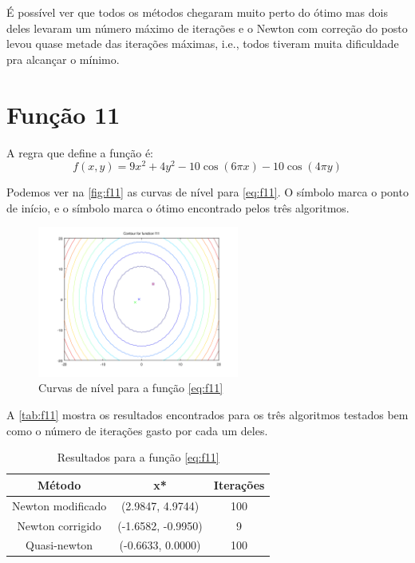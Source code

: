 \documentclass[12pt]{article}
\begin{document}
É possível ver que todos os métodos chegaram muito perto do ótimo mas dois deles levaram um número máximo de iterações e 
o Newton com correção do posto levou quase metade das iterações máximas, i.e., todos tiveram muita dificuldade pra alcançar o mínimo.	


\section{Função 11}
A regra que define a função é:
\begin{equation}
\label{eq:f11}
f(x, y) = 9x^2 + 4y^2 - 10\cos(6\pi x) - 10\cos(4\pi y)
\end{equation}

Podemos ver na \autoref{fig:f11} as curvas de nível para \autoref{eq:f11}. O símbolo \textit{\textopenbullet} marca o ponto de início,
e o símbolo \textit{\texttimes} marca o ótimo encontrado pelos três algoritmos.

\begin{figure}[H]
  \centering
  \includegraphics[width=250px]{../matlab/images/f11_contour}
  \caption{Curvas de nível para a função \autoref{eq:f11}}
  \label{fig:f11}
\end{figure}

A \autoref{tab:f11} mostra os resultados encontrados para os três algoritmos testados bem como o número de iterações gasto por cada um deles.

\begin{table}[H]
\centering
\begin{tabular}{*3c}
\toprule
Método			&	x*		&	Iterações\\
\midrule
Newton modificado	&	(2.9847, 4.9744)	&	100\\
Newton corrigido	&	(-1.6582, -0.9950)	&	9\\
Quasi-newton		&	(-0.6633, 0.0000)	&	100\\
\bottomrule
\end{tabular}
\caption{\small{Resultados para a função \autoref{eq:f11} }}
\label{tab:f11}
\end{table}
\end{document}
